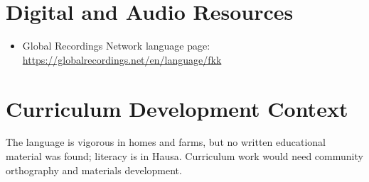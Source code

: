 \documentclass[12pt]{article}
\begin{document}
\section{Digital and Audio Resources}
\begin{itemize}
\item Global Recordings Network language page: \url{https://globalrecordings.net/en/language/fkk}
\end{itemize}

\section{Curriculum Development Context}
The language is vigorous in homes and farms, but no written educational material was found; literacy is in Hausa. Curriculum work would need community orthography and materials development.
\end{document}
